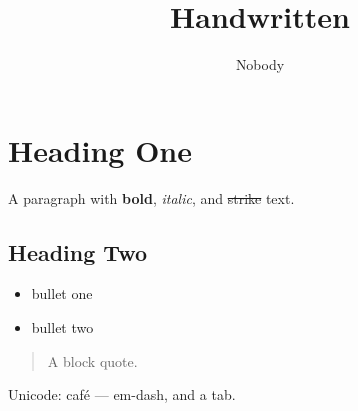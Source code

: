 \documentclass{article}
\title{Handwritten}
\author{Nobody}
\begin{document}
\maketitle

\section{Heading One}
\label{sec:one}

A paragraph with \textbf{bold}, \emph{italic}, and \sout{strike} text.

\subsection{Heading Two}

\begin{itemize}
  \item bullet one
  \item bullet two
\end{itemize}

\begin{quote}
A block quote.
\end{quote}

Unicode: café --- em-dash, and a tab.
\end{document}
